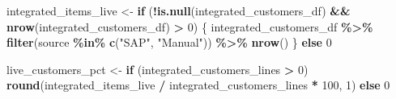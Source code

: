 \documentclass[
]{article}
\newenvironment{Shaded}{\begin{snugshade}}{\end{snugshade}}
\newcommand{\ControlFlowTok}[1]{\textcolor[rgb]{0.13,0.29,0.53}{\textbf{#1}}}
\newcommand{\DecValTok}[1]{\textcolor[rgb]{0.00,0.00,0.81}{#1}}
\newcommand{\FunctionTok}[1]{\textcolor[rgb]{0.13,0.29,0.53}{\textbf{#1}}}
\newcommand{\NormalTok}[1]{#1}
\newcommand{\OtherTok}[1]{\textcolor[rgb]{0.56,0.35,0.01}{#1}}
\newcommand{\SpecialCharTok}[1]{\textcolor[rgb]{0.81,0.36,0.00}{\textbf{#1}}}
\newcommand{\StringTok}[1]{\textcolor[rgb]{0.31,0.60,0.02}{#1}}
\begin{document}
\begin{Shaded}
\begin{Highlighting}[]
\NormalTok{        integrated\_items\_live }\OtherTok{\textless{}{-}} \ControlFlowTok{if}\NormalTok{ (}\SpecialCharTok{!}\FunctionTok{is.null}\NormalTok{(integrated\_customers\_df) }\SpecialCharTok{\&\&} \FunctionTok{nrow}\NormalTok{(integrated\_customers\_df) }\SpecialCharTok{\textgreater{}} \DecValTok{0}\NormalTok{) \{}
\NormalTok{          integrated\_customers\_df }\SpecialCharTok{\%\textgreater{}\%} \FunctionTok{filter}\NormalTok{(source }\SpecialCharTok{\%in\%} \FunctionTok{c}\NormalTok{(}\StringTok{"SAP"}\NormalTok{, }\StringTok{"Manual"}\NormalTok{)) }\SpecialCharTok{\%\textgreater{}\%} \FunctionTok{nrow}\NormalTok{()}
\NormalTok{        \} }\ControlFlowTok{else} \DecValTok{0}
        
\NormalTok{        live\_customers\_pct }\OtherTok{\textless{}{-}} \ControlFlowTok{if}\NormalTok{ (integrated\_customers\_lines }\SpecialCharTok{\textgreater{}} \DecValTok{0}\NormalTok{) }\FunctionTok{round}\NormalTok{(integrated\_items\_live }\SpecialCharTok{/}\NormalTok{ integrated\_customers\_lines }\SpecialCharTok{*} \DecValTok{100}\NormalTok{, }\DecValTok{1}\NormalTok{) }\ControlFlowTok{else} \DecValTok{0}
        

\end{Highlighting}
\end{Shaded}
\end{document}
